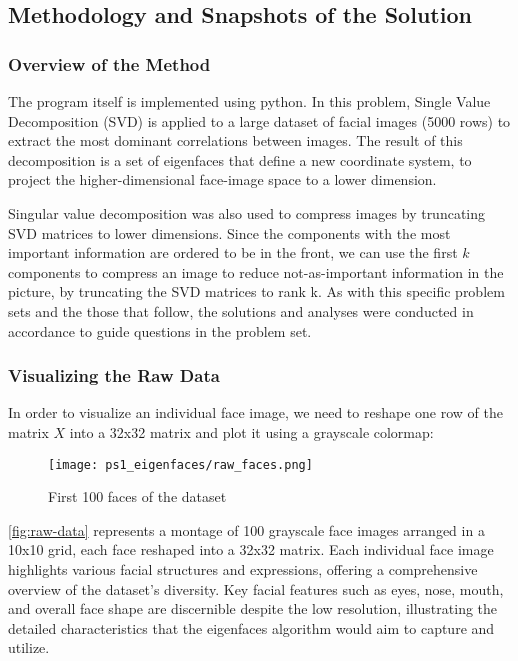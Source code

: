 \documentclass{article} %
\theoremstyle{definition}
\theoremstyle{remark}
\theoremstyle{plain}
\begin{document}
\subsection{Methodology and Snapshots of the Solution}
    \subsubsection{Overview of the Method}
        The program itself is implemented using python. In this problem, Single Value Decomposition (SVD) is applied to a large dataset of facial images (5000 rows) to extract the most dominant correlations between images. The result of this decomposition is a set of eigenfaces that define a new coordinate system, to project the higher-dimensional face-image space to a lower dimension.
   
        Singular value decomposition was also used to compress images by truncating SVD matrices to lower dimensions. Since the components with the most important information are ordered to be in the front, we can use the first \(k\) components to compress an image to reduce not-as-important information in the picture, by truncating the SVD matrices to rank k. As with this specific problem sets and the those that follow, the solutions and analyses were conducted in accordance to guide questions in the problem set.
       
    \subsubsection{Visualizing the Raw Data}
         In order to visualize an individual face image, we need to reshape one row of the matrix \( X \) into a 32x32 matrix and plot it using a grayscale colormap:
        
        \begin{figure}[h!]
            \centering
            \texttt{[image: ps1\_eigenfaces/raw\_faces.png]}
            \caption{First 100 faces of the dataset}
            \label{fig:raw-data}
        \end{figure}

        \autoref{fig:raw-data} represents a montage of 100 grayscale face images arranged in a 10x10 grid, each face reshaped into a 32x32 matrix. Each individual face image highlights various facial structures and expressions, offering a comprehensive overview of the dataset's diversity. Key facial features such as eyes, nose, mouth, and overall face shape are discernible despite the low resolution, illustrating the detailed characteristics that the eigenfaces algorithm would aim to capture and utilize.
\end{document}
